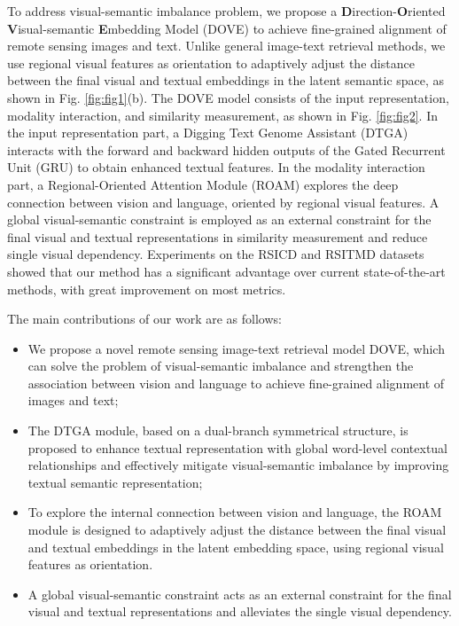 \documentclass[journal]{IEEEtran}
\begin{document}
To address visual-semantic imbalance problem, we propose a \textbf{D}irection-\textbf{O}riented \textbf{V}isual-semantic \textbf{E}mbedding Model (DOVE) to achieve fine-grained alignment of remote sensing images and text. Unlike general image-text retrieval methods, we use regional visual features as orientation to adaptively adjust the distance between the final visual and textual embeddings in the latent semantic space, as shown in Fig. \ref{fig:fig1}(b). The DOVE model consists of the input representation, modality interaction, and similarity measurement, as shown in Fig. \ref{fig:fig2}. In the input representation part, a Digging Text Genome Assistant (DTGA) interacts with the forward and backward hidden outputs of the Gated Recurrent Unit (GRU) \cite{chung2014empirical} to obtain enhanced textual features. In the modality interaction part, a Regional-Oriented Attention Module (ROAM) explores the deep connection between vision and language, oriented by regional visual features. A global visual-semantic constraint is employed as an external constraint for the final visual and textual representations in similarity measurement and reduce single visual dependency. Experiments on the  RSICD \cite{lu2017exploring} and RSITMD \cite{yuan2022exploring} datasets showed that our method has a significant advantage over current state-of-the-art methods, with great improvement on most metrics.

The main contributions of our work are as follows:
\begin{itemize}
\item We propose a novel remote sensing image-text retrieval model DOVE, which can solve the problem of visual-semantic imbalance and strengthen the association between vision and language to achieve fine-grained alignment of images and text;
\item The DTGA module, based on a dual-branch symmetrical structure, is proposed to enhance textual representation with global word-level contextual relationships and effectively mitigate visual-semantic imbalance by improving textual semantic representation;
\item To explore the internal connection between vision and language, the ROAM module is designed to adaptively adjust the distance between the final visual and textual embeddings in the latent embedding space, using regional visual features as orientation.
\item A global visual-semantic constraint acts as an external constraint for the final visual and textual representations and alleviates the single visual dependency.
\end{itemize}
\end{document}
